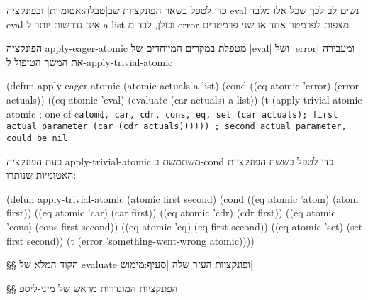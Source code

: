כדי לטפל בשאר הפונקציות שב|טבלה:אטומיות| ובפונקציה eval נשים לב לכך שכל אלו
מלבד eval אינן נדרשות יותר ל-a-list וכולן, לבד מ-error מצפות לפרמטר אחד או שני
פרמטרים.

הפונקציה apply-eager-atomic מטפלת במקרים המיוחדים של \E|eval| ושל \E|error|
ומעבירה את המשך הטיפול ל-apply-trivial-atomic
\begin{KERNEL}
(defun apply-eager-atomic (atomic actuals a-list)
  (cond
    ((eq atomic 'error) (error actuals))
    ((eq atomic 'eval) (evaluate (car actuals) a-list))
    (t (apply-trivial-atomic
        atomic ; one of ¢\tt atom¢, car, cdr, cons, eq, set
        (car actuals); first actual parameter
        (car (cdr actuals)))))) ; second actual parameter, could be nil
\end{KERNEL}

כעת הפונקציה apply-trivial-atomic משתמשת ב-cond כדי לטפל בששת הפונקציות האטומיות שנותרו:
\begin{KERNEL}
(defun apply-trivial-atomic (atomic first second)
  (cond ((eq atomic 'atom) (atom first))
        ((eq atomic 'car) (car first))
        ((eq atomic 'cdr) (cdr first))
        ((eq atomic 'cons) (cons first second))
        ((eq atomic 'eq) (eq first second))
        ((eq atomic 'set) (set first second))
        (t (error 'something-went-wrong atomic))))
\end{KERNEL}

§§ הקוד המלא של evaluate ופונקציות העזר שלה
|סעיף:מימוש|

\immediate \closeout {}
\begin{LTR}
  
\end{LTR}

§§ הפונקציות המוגדרות מראש של מיני-ליספ


